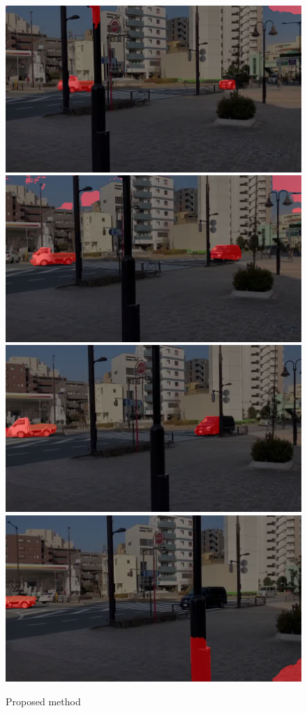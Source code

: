 \documentclass[10pt, twocolumn]{article}
\begin{document}
\begin{figure}[ht]
\begin{minipage}{0.3\linewidth}
    \includegraphics[width=\linewidth]{fig/proposed/00010.jpg}
    \includegraphics[width=\linewidth]{fig/proposed/00020.jpg}
    \includegraphics[width=\linewidth]{fig/proposed/00030.jpg}
    \includegraphics[width=\linewidth]{fig/proposed/00040.jpg}
    \caption*{Proposed method}
  \end{minipage}
  

\end{figure}
\end{document}
